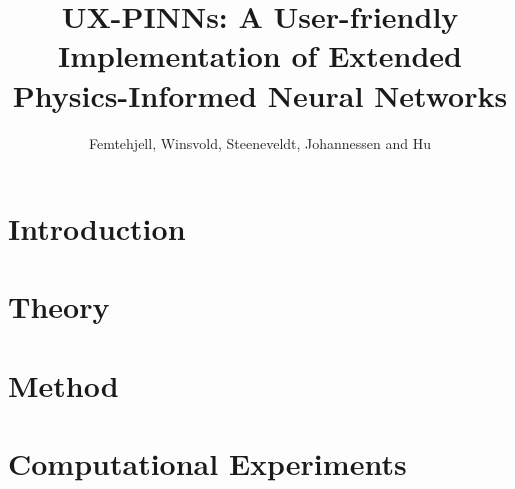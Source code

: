 \documentclass[aps,rmp,reprint,amsmath,amssymb,graphicx,longbibliography]{revtex4-1}
\begin{document}

\title{UX-PINNs: A User-friendly Implementation of Extended Physics-Informed Neural Networks}

\author{Femtehjell, Winsvold, Steeneveldt, Johannessen and Hu}


\begin{abstract}

\end{abstract}

\maketitle

\tableofcontents

\section{Introduction}
\label{sec:introduction}

\section{Theory}
\label{sec:theory}

\section{Method}
\label{sec:method}

\section{Computational Experiments}
\label{sec:compexp}


\appendix

\end{document}
